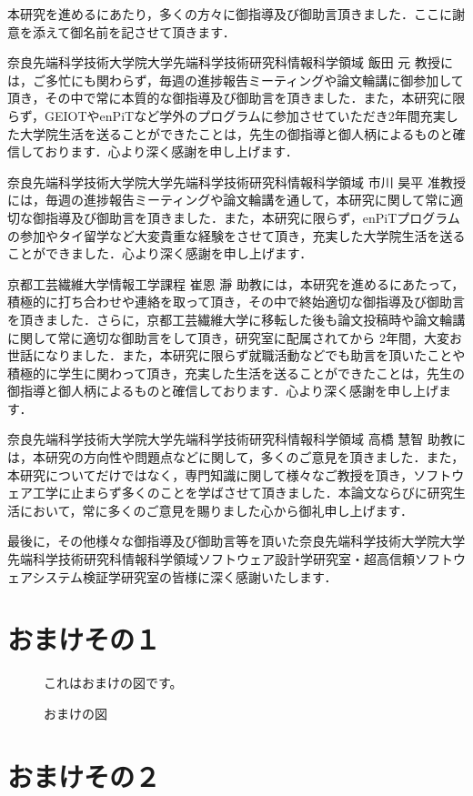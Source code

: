 \documentclass[12pt]{jarticle} %
\begin{document}
%
%
\acknowledgements

本研究を進めるにあたり，多くの方々に御指導及び御助言頂きました．ここに謝意を添えて御名前を記させて頂きます．

奈良先端科学技術大学院大学先端科学技術研究科情報科学領域 飯田 元 教授には，ご多忙にも関わらず，毎週の進捗報告ミーティングや論文輪講に御参加して頂き，その中で常に本質的な御指導及び御助言を頂きました．また，本研究に限らず，GEIOTやenPiTなど学外のプログラムに参加させていただき2年間充実した大学院生活を送ることができたことは，先生の御指導と御人柄によるものと確信しております．心より深く感謝を申し上げます．

奈良先端科学技術大学院大学先端科学技術研究科情報科学領域 市川 昊平 准教授には，毎週の進捗報告ミーティングや論文輪講を通して，本研究に関して常に適切な御指導及び御助言を頂きました．また，本研究に限らず，enPiTプログラムの参加やタイ留学など大変貴重な経験をさせて頂き，充実した大学院生活を送ることができました．心より深く感謝を申し上げます．

京都工芸繊維大学情報工学課程 崔恩 瀞 助教には，本研究を進めるにあたって，積極的に打ち合わせや連絡を取って頂き，その中で終始適切な御指導及び御助言を頂きました．さらに，京都工芸繊維大学に移転した後も論文投稿時や論文輪講に関して常に適切な御助言をして頂き，研究室に配属されてから 2年間，大変お世話になりました．また，本研究に限らず就職活動などでも助言を頂いたことや積極的に学生に関わって頂き，充実した生活を送ることができたことは，先生の御指導と御人柄によるものと確信しております．心より深く感謝を申し上げます．

奈良先端科学技術大学院大学先端科学技術研究科情報科学領域 高橋 慧智 助教には，本研究の方向性や問題点などに関して，多くのご意見を頂きました．また，本研究についてだけではなく，専門知識に関して様々なご教授を頂き，ソフトウェア工学に止まらず多くのことを学ばさせて頂きました．本論文ならびに研究生活において，常に多くのご意見を賜りました心から御礼申し上げます．
 
最後に，その他様々な御指導及び御助言等を頂いた奈良先端科学技術大学院大学先端科学技術研究科情報科学領域ソフトウェア設計学研究室・超高信頼ソフトウェアシステム検証学研究室の皆様に深く感謝いたします．


%
%
\newpage


%
%
\appendix

\section{おまけその１}
\label{omake1}



\begin{figure}
\centerline{これはおまけの図です。}
\caption{おまけの図}
\end{figure}


\section{おまけその２}
\end{document}
